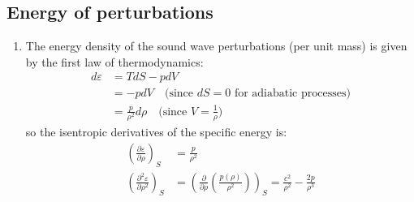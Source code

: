 ﻿\documentclass[11pt]{article}
\begin{document}
\subsection{Energy of perturbations}
\begin{enumerate}
  \item The energy density of the sound wave perturbations (per unit mass) is given by the first law of thermodynamics:
  \begin{align}
    d\varepsilon &= T dS - p dV \\
    &= -p dV \quad \text{(since $dS=0$ for adiabatic processes)} \\
    &= \frac{p}{\rho^2} d\rho \quad \text{(since $V=\frac{1}{\rho}$)}
  \end{align}
  so the isentropic derivatives of the specific energy is:
  \begin{align}
    \left(\frac{\partial \varepsilon}{\partial \rho}\right)_{S}&=\frac{p}{\rho^2}
    \\ \left(\frac{\partial^2 \varepsilon}{\partial \rho ^2}\right)_{S} &= \left( \frac{\partial}{\partial \rho} \left(\frac{p(\rho)}{\rho^2}\right) \right)_S = \frac{c^2}{\rho^2} -\frac{2p}{\rho^3}
  \end{align}
  

\end{enumerate}
\end{document}
